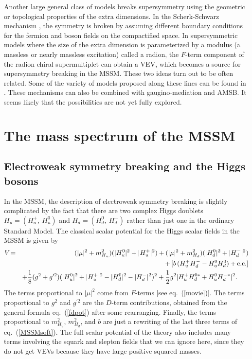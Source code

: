 \documentclass[12pt]{article}
\renewcommand{\theequation}{\arabic{section}.\arabic{equation}}
\def\beq{\begin{eqnarray}}
\def\eeq{\end{eqnarray}}
\def\conj{{{\rm c.c.}}}
\def\half{{1\over 2}}
\begin{document}
Another large general class of models breaks supersymmetry using the 
geometric or topological 
properties of the extra dimensions. In the Scherk-Schwarz 
mechanism \cite{ScherkSchwarz}, the symmetry is broken by 
assuming different boundary 
conditions for the fermion and boson fields on the compactified space. In 
supersymmetric models where the size of the extra dimension is 
parameterized by a modulus (a massless or nearly massless excitation) 
called a radion, the $F$-term component of the radion chiral 
supermultiplet can obtain a VEV, which becomes a source for supersymmetry 
breaking in the MSSM. These two ideas turn out to be often related. 
Some of the variety of models proposed along these lines can be found in 
\cite{SSandradion}. These mechanisms 
can also be combined with gaugino-mediation and AMSB. 
It seems likely that the possibilities are not yet fully explored.

\section{The mass spectrum of the MSSM}\label{sec:MSSMspectrum}
\renewcommand{\theequation}{\arabic{section}.\arabic{subsection}.\arabic{equation}}
\setcounter{equation}{0}
\setcounter{figure}{0}
\setcounter{table}{0}
\setcounter{footnote}{1}


\subsection{Electroweak symmetry breaking and the Higgs
bosons}\label{subsec:MSSMspectrum.Higgs}
\setcounter{equation}{0}
\setcounter{footnote}{1}

In the MSSM, the description of electroweak symmetry breaking is slightly 
complicated by the fact that there are two complex Higgs doublets $H_u = 
(H_u^+,\> H_u^0)$ and $H_d = (H_d^0,\> H_d^-)$ rather than just one in the 
ordinary Standard Model. The classical scalar potential for the Higgs 
scalar fields in the MSSM is given by
\beq
V\! &=&\!
(|\mu|^2 + m^2_{H_u}) (|H_u^0|^2 + |H_u^+|^2)
+ (|\mu|^2 + m^2_{H_d}) (|H_d^0|^2 + |H_d^-|^2)
\nonumber \\ &&
+\, [b\, (H_u^+ H_d^- - H_u^0 H_d^0) + \conj]
\nonumber \\ &&
+ {1\over 8} (g^2 + g^{\prime 2})
(|H_u^0|^2 + |H_u^+|^2 - |H_d^0|^2 - |H_d^-|^2 )^2
+ \half g^2 |H_u^+ H_d^{0*} + H_u^0 H_d^{-*}|^2 .
\phantom{xxx}
\label{bighiggsv}
\eeq
The terms proportional to $|\mu |^2$ come from $F$-terms [see 
eq.~(\ref{movie})].  The terms proportional to $g^2$ and $g^{\prime 2}$ 
are the $D$-term contributions, obtained from the general 
formula eq.~(\ref{fdpot}) after some rearranging. Finally, the terms 
proportional to $m_{H_u}^2$, $m_{H_d}^2$, and $b$ are just a 
rewriting of the last three terms of eq.~(\ref{MSSMsoft}). The full scalar 
potential of the theory also includes many terms involving the squark and 
slepton fields that we can ignore here, since they do not get VEVs because 
they have large positive squared masses.
\end{document}
